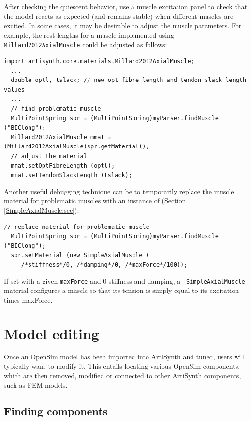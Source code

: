 \begin{itemize}
After checking the quiescent behavior, use a muscle excitation panel to check
that the model reacts as expected (and remains stable) when different muscles
are excited. In some cases, it may be desirable to adjust the muscle
parameters. For example, the rest lengths for a muscle implemented using {\tt
Millard2012AxialMuscle} could be adjusted as follows:
%
\begin{lstlisting}[]
import artisynth.core.materials.Millard2012AxialMuscle;
  ...
  double optl, tslack; // new opt fibre length and tendon slack length values
  ...
  // find problematic muscle
  MultiPointSpring spr = (MultiPointSpring)myParser.findMuscle ("BIClong");
  Millard2012AxialMuscle mmat = (Millard2012AxialMuscle)spr.getMaterial();
  // adjust the material
  mmat.setOptFibreLength (optl);
  mmat.setTendonSlackLength (tslack);
\end{lstlisting}
%
Another useful debugging technique can be to temporarily replace
the muscle material for problematic muscles with an instance of
 (Section \ref{SimpleAxialMuscle:sec}):
%
\begin{lstlisting}[]
  // replace material for problematic muscle
  MultiPointSpring spr = (MultiPointSpring)myParser.findMuscle ("BIClong");
  spr.setMaterial (new SimpleAxialMuscle (
     /*stiffness*/0, /*damping*/0, /*maxForce*/100));
\end{lstlisting}
%
If set with a given {\tt maxForce} and 0 stiffness and damping, a {\tt
SimpleAxialMuscle} material configures a muscle so that its tension is simply
equal to its {\sf excitation} times {\sf maxForce}.

\end{itemize}

\section{Model editing}
\label{OpenSimModelEditing:sec}

Once an OpenSim model has been imported into ArtiSynth and tuned, users will
typically want to modify it. This entails locating various OpenSim components,
which are then removed, modified or connected to other ArtiSynth components,
such as FEM models.

\subsection{Finding components}
\label{OpenSimFindingComponents:sec}

